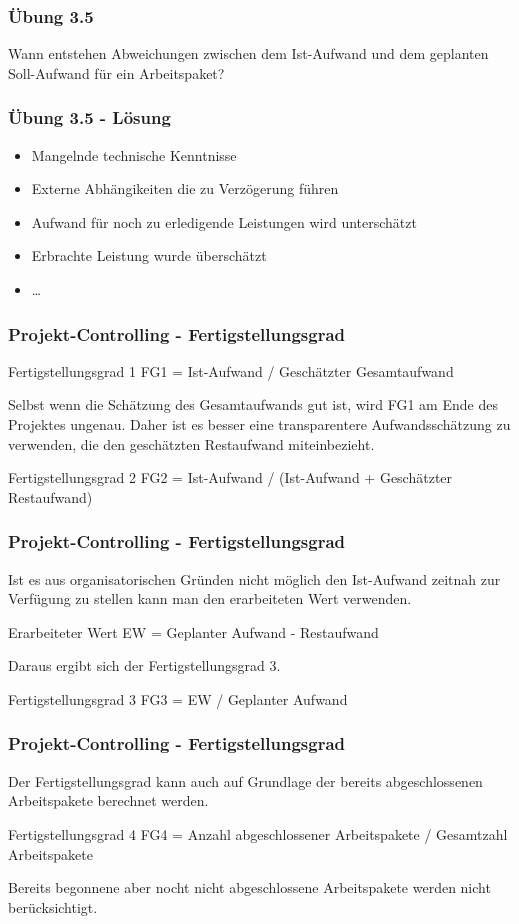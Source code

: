 \begin{frame}
\frametitle{Übung 3.5}
	Wann entstehen Abweichungen zwischen dem Ist-Aufwand und dem geplanten Soll-Aufwand für ein
	Arbeitspaket?
\end{frame}

\ifloesung
\begin{frame}
\frametitle{Übung 3.5 - Lösung}
	\begin{itemize}
		\item Mangelnde technische Kenntnisse
		\item Externe Abhängikeiten die zu Verzögerung führen
		\item Aufwand für noch zu erledigende Leistungen wird unterschätzt
		\item Erbrachte Leistung wurde überschätzt
		\item \ldots
	\end{itemize}
\end{frame}
\fi

\begin{frame}
\frametitle{Projekt-Controlling - Fertigstellungsgrad}
	\begin{block}{Fertigstellungsgrad 1}
		FG1 = Ist-Aufwand / Geschätzter Gesamtaufwand
	\end{block}
	Selbst wenn die Schätzung des Gesamtaufwands gut ist, wird FG1 am Ende des Projektes ungenau.
	Daher ist es besser eine transparentere Aufwandsschätzung zu verwenden, die den geschätzten
	Restaufwand miteinbezieht.
	\begin{block}{Fertigstellungsgrad 2}
		FG2 = Ist-Aufwand / (Ist-Aufwand + Geschätzter Restaufwand)
	\end{block}
\end{frame}

\begin{frame}
\frametitle{Projekt-Controlling - Fertigstellungsgrad}
	Ist es aus organisatorischen Gründen nicht möglich den Ist-Aufwand zeitnah zur
	Verfügung zu stellen kann man den erarbeiteten Wert verwenden.
	\begin{block}{Erarbeiteter Wert}
		EW = Geplanter Aufwand - Restaufwand
	\end{block}
	Daraus ergibt sich der Fertigstellungsgrad 3.
	\begin{block}{Fertigstellungsgrad 3}
		FG3 = EW / Geplanter Aufwand
	\end{block}
\end{frame}

\begin{frame}
\frametitle{Projekt-Controlling - Fertigstellungsgrad}
	Der Fertigstellungsgrad kann auch auf Grundlage der bereits abgeschlossenen Arbeitspakete
	berechnet werden.
	\begin{block}{Fertigstellungsgrad 4}
		FG4 = Anzahl abgeschlossener Arbeitspakete / Gesamtzahl Arbeitspakete
	\end{block}
	Bereits begonnene aber nocht nicht abgeschlossene Arbeitspakete werden nicht berücksichtigt.
\end{frame}

